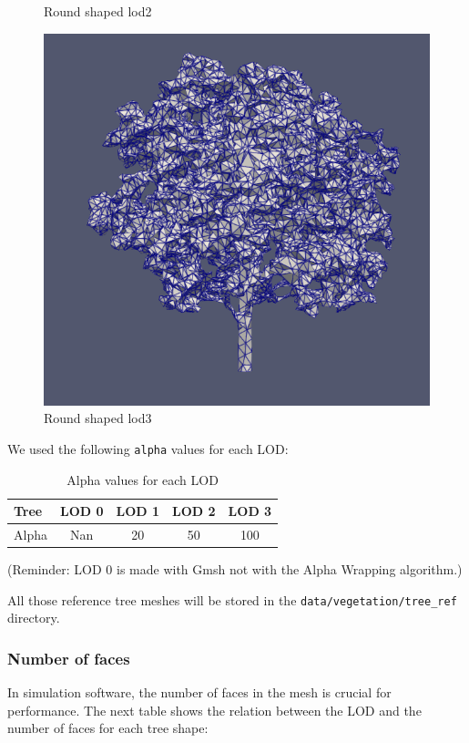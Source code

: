 \documentclass[12pt]{article}
\begin{document}
\begin{figure}[H]
\begin{minipage}{0.30\textwidth}
        \caption{Round shaped lod2}
    \end{minipage}
    \begin{minipage}{0.30\textwidth}
        \centering
        \includegraphics[width=1\textwidth]{images/tree-round_lod3.png}
        \caption{Round shaped lod3}
    \end{minipage}
\end{figure}


We used the following \texttt{alpha} values for each LOD:
\begin{table}[H]
    \centering
    \begin{tabular}{|l|c|c|c|c|}
    \hline
    Tree & LOD 0 & LOD 1 & LOD 2 & LOD 3 \\
    \hline
    Alpha & Nan & 20 & 50 & 100 \\
    \hline
    \end{tabular}
    \caption{Alpha values for each LOD}
    \label{tab:my_label}
\end{table}

(Reminder: LOD 0 is made with Gmsh not with the Alpha Wrapping algorithm.)

All those reference tree meshes will be stored in the \texttt{data/vegetation/tree\_ref}
 directory.

\subsubsection{Number of faces}
In simulation software, the number of faces in the mesh is crucial for
performance. The next table shows the relation between the LOD and the number of
 faces for each tree shape:
\end{document}
